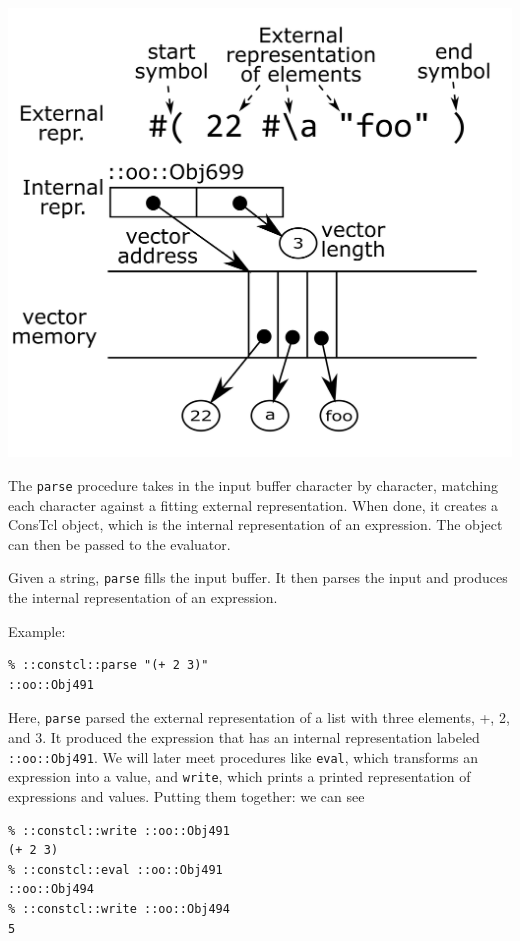 \documentclass[twoside,9pt]{report}
\begin{document}
\includegraphics{images/vector-representation}


The \texttt{parse} procedure takes in the input buffer character by character, matching each character against a fitting external representation. When done, it creates a ConsTcl object, which is the internal representation of an expression. The object can then be passed to the evaluator.


Given a string, \texttt{parse} fills the input buffer. It then parses the input and produces the internal representation of an expression.


Example:

\noindent\makebox[\linewidth]{\rule{\linewidth}{0.4pt}}
\begin{lstlisting}
% ::constcl::parse "(+ 2 3)"
::oo::Obj491
\end{lstlisting}
\noindent\makebox[\linewidth]{\rule{\linewidth}{0.4pt}}

Here, \texttt{parse} parsed the external representation of a list with three elements, +, 2, and 3. It produced the expression that has an internal representation labeled \texttt{::oo::Obj491}. We will later meet procedures like \texttt{eval}, which transforms an expression into a value, and \texttt{write}, which prints a printed representation of expressions and values. Putting them together: we can see

\noindent\makebox[\linewidth]{\rule{\linewidth}{0.4pt}}
\begin{lstlisting}
% ::constcl::write ::oo::Obj491
(+ 2 3)
% ::constcl::eval ::oo::Obj491
::oo::Obj494
% ::constcl::write ::oo::Obj494
5
\end{lstlisting}
\noindent\makebox[\linewidth]{\rule{\linewidth}{0.4pt}}
\end{document}
